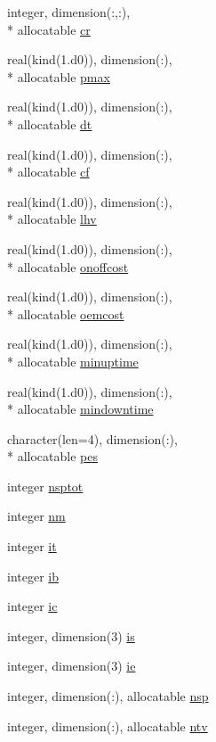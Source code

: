 \begin{DoxyCompactItemize}
integer, dimension(\-:,\-:), \\*
allocatable \hyperlink{classplantvar_a01620e31bb05f1443908f0bff75215a4}{cr}
\item 
real(kind(1.d0)), dimension(\-:), \\*
allocatable \hyperlink{classplantvar_af133780045aedae72cab4d1d76ec16e5}{pmax}
\item 
real(kind(1.d0)), dimension(\-:), \\*
allocatable \hyperlink{classplantvar_accb7934f0d0c68401dc43ec6bb59bbe4}{dt}
\item 
real(kind(1.d0)), dimension(\-:), \\*
allocatable \hyperlink{classplantvar_a4c8201cedf0b99fc56c20ed525d1989f}{cf}
\item 
real(kind(1.d0)), dimension(\-:), \\*
allocatable \hyperlink{classplantvar_a7c8060d92515eb94b517dbd9f9d93801}{lhv}
\item 
real(kind(1.d0)), dimension(\-:), \\*
allocatable \hyperlink{classplantvar_a2eeecb6eae117408ce2858d0aca03c7d}{onoffcost}
\item 
real(kind(1.d0)), dimension(\-:), \\*
allocatable \hyperlink{classplantvar_a7d84f514ffc359590a9038d738c75705}{oemcost}
\item 
real(kind(1.d0)), dimension(\-:), \\*
allocatable \hyperlink{classplantvar_a73cafc729d430c73ded6746bd7809315}{minuptime}
\item 
real(kind(1.d0)), dimension(\-:), \\*
allocatable \hyperlink{classplantvar_af23a22d3c3cd5bff0845e7110615e6ae}{mindowntime}
\item 
character(len=4), dimension(\-:), \\*
allocatable \hyperlink{classplantvar_a8b75644cc6f0b1728b0fdcd7c575c177}{pes}
\item 
integer \hyperlink{classplantvar_a1301bcb36aec6c118be8c084932de099}{nsptot}
\item 
integer \hyperlink{classplantvar_a137041d7f1c30cc7d248b9ada4feab69}{nm}
\item 
integer \hyperlink{classplantvar_a05f1670af399c966c49b07aa825f279e}{it}
\item 
integer \hyperlink{classplantvar_a1ee94e03e80cea12dff918a70f1a7993}{ib}
\item 
integer \hyperlink{classplantvar_ad912cbd511b056bee83744eefe0c0ef8}{ic}
\item 
integer, dimension(3) \hyperlink{classplantvar_add18a489fead102059c74cf8875f94e0}{is}
\item 
integer, dimension(3) \hyperlink{classplantvar_a9a1a47dc2865d900ce5834934d4c6c06}{ie}
\item 
integer, dimension(\-:), allocatable \hyperlink{classplantvar_a16e98f1a836d4de3e5436365e77441b0}{nsp}
\item 
integer, dimension(\-:), allocatable \hyperlink{classplantvar_a019098844671b06b71ae0b76aa3d4fa8}{ntv}
\end{DoxyCompactItemize}


